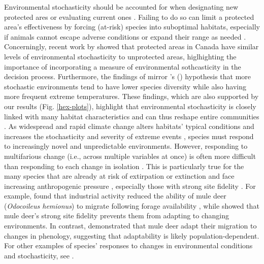 \documentclass{article}
\begin{document}
Environmental stochasticity should be accounted for when designating new protected ares or evaluating current ones \citep{marcus_planning_2025}. Failing to do so can limit a protected area's effectiveness by forcing (at-risk) species into suboptimal habitats, especially if animals cannot escape adverse conditions or expand their range as needed \citep{ortega_migrating_2023, aikens_drought_2020}. Concerningly, recent work by \citep{marcus_planning_2025} showed that protected areas in Canada have similar levels of environmental stochasticity to unprotected areas, higlhighting the importance of incorporating a measure of environmental sothcasticity in the decision process. Furthermore, the findings of \citet{marcus_planning_2025} mirror \citeauthor{levins_evolution_1974}'s (\citeyear{levins_evolution_1974}) hypothesis that more stochastic environments tend to have lower species diversity while also having more frequent extreme temperatures. These findings, which are also supported by our results (Fig. \ref{hex-plots}), highlight that environmental stochasticity is closely linked with many habitat characteristics and can thus reshape entire communities \citep{logares_black_2012, oestreich_resource_2026}. As widespread and rapid climate change alters habitats' typical conditions \citep{loarie_velocity_2009, diffenbaugh_changes_2013, ipcc_climate_2023} and increases the stochasticity and severity of extreme events \citep{ipcc_climate_2023}, species must respond to increasingly novel and unpredictable environments. However, responding to multifarious change (i.e., across multiple variables at once) is often more difficult than responding to each change in isolation \citep{polazzo_measuring_2024}. This is particularly true for the many species that are already at risk of extirpation or extinction and face increasing anthropogenic pressure \citep{tucker_moving_2018, weststrate_how_2024}, especially those with strong site fidelity \citep{merkle_site_2022}. For example, \citet{aikens_industrial_2022} found that industrial activity reduced the ability of mule deer (\emph{Odocoileus hemionus}) to migrate following forage availability \citep[also see][]{xu_plasticity_2021}, while \citet{sawyer_migratory_2019} showed that mule deer's strong site fidelity prevents them from adapting to changing environments. In contrast, \citet{ortega_migrating_2023} demonstrated that mule deer adapt their migration to changes in phenology, suggesting that adaptability is likely population-dependent. For other examples of species' responses to changes in environmental conditions and stochasticity, see \citet{harris_biological_2018}.
\end{document}
